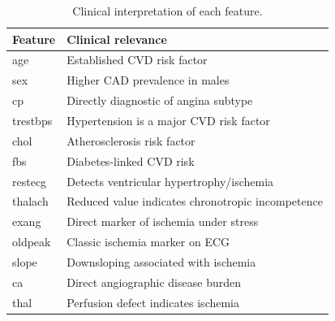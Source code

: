 \begin{table}[t]
\centering
\caption{Clinical interpretation of each feature.}
\label{tab:clinical}
\small
\begin{tabular}{lp{6.5cm}}
\toprule
Feature & Clinical relevance \\
\midrule
age & Established CVD risk factor \\
sex & Higher CAD prevalence in males \\
cp & Directly diagnostic of angina subtype \\
trestbps & Hypertension is a major CVD risk factor \\
chol & Atherosclerosis risk factor \\
fbs & Diabetes-linked CVD risk \\
restecg & Detects ventricular hypertrophy/ischemia \\
thalach & Reduced value indicates chronotropic incompetence \\
exang & Direct marker of ischemia under stress \\
oldpeak & Classic ischemia marker on ECG \\
slope & Downsloping associated with ischemia \\
ca & Direct angiographic disease burden \\
thal & Perfusion defect indicates ischemia \\
\bottomrule
\end{tabular}
\end{table}

